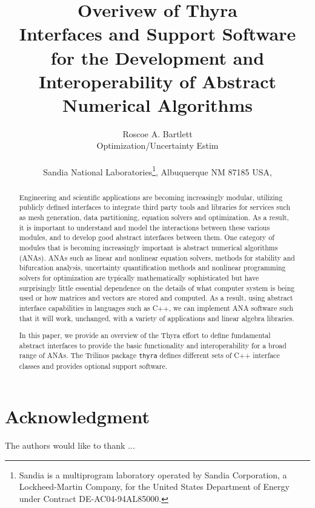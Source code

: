 \documentclass[pdf,ps2pdf,11pt]{SANDreport}
\title{\center
Overivew of Thyra\\[2ex] Interfaces and Support Software for the Development
and Interoperability of Abstract Numerical Algorithms}
\author{
Roscoe A. Bartlett \\ Optimization/Uncertainty Estim \\ \\ Sandia National
Laboratories\footnote{ Sandia is a multiprogram laboratory operated by Sandia
Corporation, a Lockheed-Martin Company, for the United States Department of
Energy under Contract DE-AC04-94AL85000.}, Albuquerque NM 87185 USA, \\ }
\date{}
\begin{document}
\maketitle

%

%
\begin{abstract}
%
Engineering and scientific applications are becoming increasingly modular,
utilizing publicly defined interfaces to integrate third party tools and
libraries for services such as mesh generation, data partitioning, equation
solvers and optimization.  As a result, it is important to understand and
model the interactions between these various modules, and to develop good
abstract interfaces between them.  One category of modules that is becoming
increasingly important is abstract numerical algorithms (ANAs).  ANAs such as
linear and nonlinear equation solvers, methods for stability and bifurcation
analysis, uncertainty quantification methods and nonlinear programming solvers
for optimization are typically mathematically sophisticated but have
surprisingly little essential dependence on the details of what computer
system is being used or how matrices and vectors are stored and computed.  As
a result, using abstract interface capabilities in languages such as C++, we
can implement ANA software such that it will work, unchanged, with a variety
of applications and linear algebra libraries.

In this paper, we provide an overview of the Thyra effort to define
fundamental abstract interfaces to provide the basic functionality and
interoperability for a broad range of ANAs.  The Trilinos package
{}\texttt{thyra} defines different sets of C++ interface classes and provides
optional support software.
%
\end{abstract}
%

%
\clearpage
\section*{Acknowledgment}
The authors would like to thank ...
\end{document}
